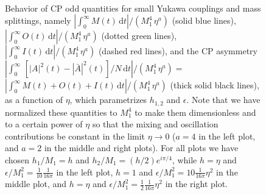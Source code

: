 \documentclass[11pt,a4paper]{article}
\providecommand{\dif}[0]{\mathrm{d}}
\providecommand{\abs}[1]{\left\lvert #1 \right\rvert}
\providecommand{\abss}[1]{\left\lvert #1 \right\rvert^2}
\begin{document}
\begin{figure}[!t]
\centerline{\protect\hbox{
}} 
\caption[]{Behavior of CP odd quantities for small Yukawa couplings and mass splittings, namely $\abs{\int_0^\infty  M(t) \, \dif t}/(M_1^4 \, \eta^a)$ (solid blue lines), $\abs{\int_0^\infty  O(t) \, \dif t}/(M_1^4 \, \eta^a)$ (dotted green lines), $\abs{\int_0^\infty  I(t) \, \dif t}/(M_1^4 \, \eta^a)$ (dashed red lines), and the CP asymmetry $\abs{\int_0^\infty  \, [\abss{A}(t)-\abss{\bar A}(t)]/N \, \dif t}/(M_1^4 \, \eta^a) =$ $\abs{\int_0^\infty M(t) + O(t) + I(t) \, \dif t}/(M_1^4 \, \eta^a)$ (thick solid black lines), as a function of $\eta$, which parametrizes $h_{1,2}$ and $\epsilon$. Note that we have normalized these quantities to $M_1^4$ to make them dimensionless and to a certain power of $\eta$ so that the mixing and oscillation contributions be constant in the limit $\eta \to 0$ ($a=4$ in the left plot, and $a=2$ in the middle and right plots). For all plots we have chosen $h_1/M_1= h$ and $h_2/M_1=(h/2) e^{i \pi/4}$, while $h=\eta$ and $\epsilon/M_1^2 = \tfrac{1}{10} \tfrac{1}{16 \pi}$ in the left plot, $h=1$ and $\epsilon/M_1^2 = 10 \tfrac{1}{16 \pi} \eta^2$ in the middle plot, and $h=\eta$ and $\epsilon/M_1^2 =  \tfrac{1}{2} \tfrac{1}{16 \pi} \eta^2$ in the right plot. 
} 
\label{fig:0}
\end{figure}
\end{document}
